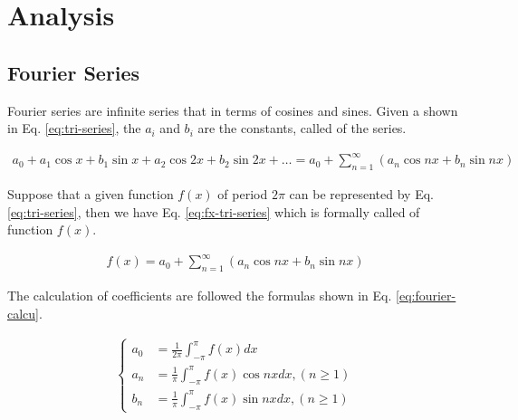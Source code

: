 \section{Analysis}

\subsection{Fourier Series}

Fourier series are infinite series that  in terms of cosines and sines.
Given a  shown in Eq. \ref{eq:tri-series}, the $a_i$ and $b_i$ are the constants, called  of the series.

\begin{align}
  a_0 + a_1 \cos x + b_1 \sin x + a_2 \cos 2x + b_2 \sin 2x + \dots = a_0 + \sum^\infty_{n=1}(a_n \cos nx + b_n \sin nx)
  \label{eq:tri-series}
\end{align}

Suppose that a given function $f(x)$ of period $2\pi$ can be represented by Eq. \ref{eq:tri-series}, then we have Eq. \ref{eq:fx-tri-series} which is formally called  of function $f(x)$.

\begin{align}
  f(x) = a_0 + \sum^\infty_{n=1}(a_n \cos nx + b_n \sin nx)
  \label{eq:fx-tri-series}
\end{align}

The calculation of coefficients are followed the formulas shown in Eq. \ref{eq:fourier-calcu}.

\begin{align}
  \begin{cases}
    a_0 &= \frac{1}{2\pi}\int_{-\pi}^{\pi} f(x) dx \\
    a_n &= \frac{1}{\pi}\int_{-\pi}^{\pi} f(x)\cos nx dx, (n \geq 1) \\
    b_n &= \frac{1}{\pi}\int_{-\pi}^{\pi} f(x)\sin nx dx, (n \geq 1)
  \end{cases}
  \label{eq:fourier-calcu}
\end{align}